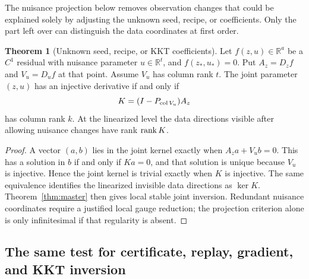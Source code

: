 \documentclass[11pt,a4paper]{article}
\theoremstyle{definition}
\newtheorem{theorem}{Theorem}[section]
\theoremstyle{definition}
\theoremstyle{remark}\newtheorem{remark}[theorem]{Remark}
\newcommand{\R}{\mathbb R}\newcommand{\Prob}{\mathbb P}\newcommand{\E}{\mathbb E}
\newcommand{\proj}[1]{P_{#1}}
\begin{document}
The nuisance projection below removes observation changes that could be explained solely by adjusting the unknown seed, recipe, or coefficients. Only the part left over can distinguish the data coordinates at first order.

\begin{theorem}[Unknown seed, recipe, or KKT coefficients]\label{thm:nuisance}
Let $f(z,u)\in\R^a$ be a $C^1$ residual with nuisance parameter $u\in\R^t$, and $f(z_*,u_*)=0$. Put $A_z=D_zf$ and $V_u=D_uf$ at that point. Assume $V_u$ has column rank $t$. The joint parameter $(z,u)$ has an injective derivative if and only if
\[
K=(I-\proj{\col V_u})A_z
\]
has column rank $k$. At the linearized level the data directions visible after allowing nuisance changes have rank $\operatorname{rank} K$.
\end{theorem}
\begin{proof}
A vector $(a,b)$ lies in the joint kernel exactly when $A_za+V_ub=0$. This has a solution in $b$ if and only if $Ka=0$, and that solution is unique because $V_u$ is injective. Hence the joint kernel is trivial exactly when $K$ is injective. The same equivalence identifies the linearized invisible data directions as $\ker K$. Theorem~\ref{thm:master} then gives local stable joint inversion. Redundant nuisance coordinates require a justified local gauge reduction; the projection criterion alone is only infinitesimal if that regularity is absent.
\end{proof}

\subsection{The same test for certificate, replay, gradient, and KKT inversion}
\end{document}
